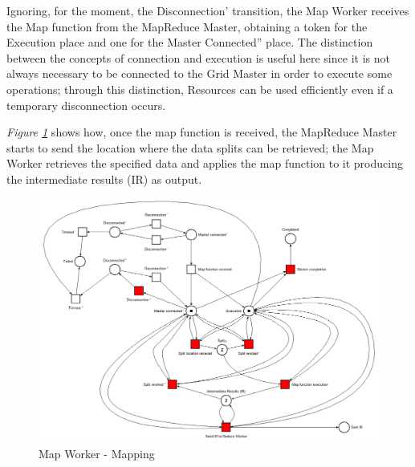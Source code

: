 Ignoring, for the moment, the Disconnection' transition, the Map Worker receives the Map function from the MapReduce Master, obtaining a token for the Execution place and one for the Master Connected'' place. The distinction between the concepts of connection and execution is useful here since it is not always necessary to be connected to the Grid Master in order to execute some operations; through this distinction, Resources can be used efficiently even if a temporary disconnection occurs.

\textit{Figure \ref{fig:map_worker_petri_net_2}} shows how, once the map function is received, the MapReduce Master starts to send the location where the data splits can be retrieved; the Map Worker retrieves the specified data and applies the map function to it producing the intermediate results (IR) as output.

\vspace{5mm}

\begin{figure}[!ht]
    \centering
    \includegraphics[width=\linewidth]{document/chapters/chapter_6/images/map_worker_petri_net_2.png}
    \caption{Map Worker - Mapping}
    \label{fig:map_worker_petri_net_2}
\end{figure}


